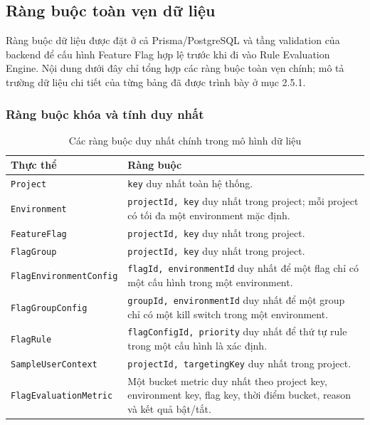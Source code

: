 \subsection{Ràng buộc toàn vẹn dữ liệu}

Ràng buộc dữ liệu được đặt ở cả Prisma/PostgreSQL và tầng validation của backend để cấu hình Feature Flag hợp lệ trước khi đi vào Rule Evaluation Engine. Nội dung dưới đây chỉ tổng hợp các ràng buộc toàn vẹn chính; mô tả trường dữ liệu chi tiết của từng bảng đã được trình bày ở mục 2.5.1.

\subsubsection{Ràng buộc khóa và tính duy nhất}

\begin{table}[H]
    \centering
    \caption{Các ràng buộc duy nhất chính trong mô hình dữ liệu}
    \label{tab:unique-constraints}
    \begingroup
    \singlespacing
    \small
    \setlength{\tabcolsep}{4pt}
    \renewcommand{\arraystretch}{1.12}
    \begin{tabular}{p{} p{}}
        \toprule
        \textbf{Thực thể} & \textbf{Ràng buộc} \\
        \midrule
        \texttt{Project} & \texttt{key} duy nhất toàn hệ thống. \\
        \texttt{Environment} & \texttt{projectId, key} duy nhất trong project; mỗi project có tối đa một environment mặc định. \\
        \texttt{FeatureFlag} & \texttt{projectId, key} duy nhất trong project. \\
        \texttt{FlagGroup} & \texttt{projectId, key} duy nhất trong project. \\
        \texttt{FlagEnvironmentConfig} & \texttt{flagId, environmentId} duy nhất để một flag chỉ có một cấu hình trong một environment. \\
        \texttt{FlagGroupConfig} & \texttt{groupId, environmentId} duy nhất để một group chỉ có một kill switch trong một environment. \\
        \texttt{FlagRule} & \texttt{flagConfigId, priority} duy nhất để thứ tự rule trong một cấu hình là xác định. \\
        \texttt{SampleUserContext} & \texttt{projectId, targetingKey} duy nhất trong project. \\
        \texttt{FlagEvaluationMetric} & Một bucket metric duy nhất theo project key, environment key, flag key, thời điểm bucket, reason và kết quả bật/tắt. \\
        \bottomrule
    \end{tabular}
    \endgroup
\end{table}

